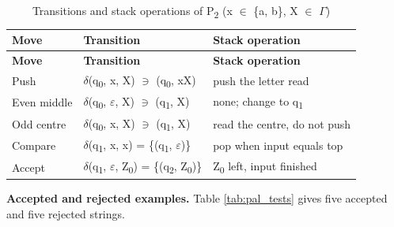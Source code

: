 \documentclass[12pt,a4paper]{article}
\begin{document}
{\footnotesize
\begin{longtable}{|>{\raggedright\arraybackslash}p{}|>{\raggedright\arraybackslash}p{}|>{\raggedright\arraybackslash}p{}|}
\caption[Transitions and stack operations of P2 (x \ensuremath{\in} \{a, b\}, X \ensuremath{\in} \ensuremath{\Gamma})]{Transitions and stack operations of P\textsubscript{2} (x \ensuremath{\in} \{a, b\}, X \ensuremath{\in} \ensuremath{\Gamma})}\label{tab:pal_delta}\\
\hline
\rowcolor{hdr}\textbf{Move} & \textbf{Transition} & \textbf{Stack operation}\\ \hline
\endfirsthead
\hline
\rowcolor{hdr}\textbf{Move} & \textbf{Transition} & \textbf{Stack operation}\\ \hline
\endhead
Push & \ensuremath{\delta}(q\textsubscript{0}, x, X) \ensuremath{\ni} (q\textsubscript{0}, xX) & push the letter read\\ \hline
Even middle & \ensuremath{\delta}(q\textsubscript{0}, \ensuremath{\varepsilon}, X) \ensuremath{\ni} (q\textsubscript{1}, X) & none; change to q\textsubscript{1}\\ \hline
Odd centre & \ensuremath{\delta}(q\textsubscript{0}, x, X) \ensuremath{\ni} (q\textsubscript{1}, X) & read the centre, do not push\\ \hline
Compare & \ensuremath{\delta}(q\textsubscript{1}, x, x) = \{(q\textsubscript{1}, \ensuremath{\varepsilon})\} & pop when input equals top\\ \hline
Accept & \ensuremath{\delta}(q\textsubscript{1}, \ensuremath{\varepsilon}, Z\textsubscript{0}) = \{(q\textsubscript{2}, Z\textsubscript{0})\} & Z\textsubscript{0} left, input finished\\ \hline
\end{longtable}}

\textbf{Accepted and rejected examples.} Table \ref{tab:pal_tests} gives five accepted and five rejected strings.
\end{document}
